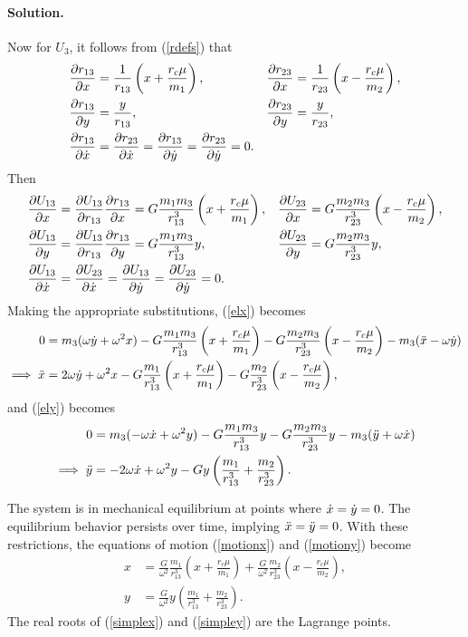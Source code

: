 \documentclass[11pt]{article}
\newcommand{\refeq}[1]{(\ref{#1})}
\newenvironment{solution}
{
    \paragraph{Solution.}
    \ignorespaces
}
{
    \bigskip
}
\begin{document}
\begin{solution}
	Now for $U_3$, it follows from \refeq{rdefs} that
	\begin{align}
		\pdv{r_{13}}{x} &= \frac{1}{r_{13}} \left( x + \frac{r_c \mu}{m_1} \right), &
		\pdv{r_{23}}{x} &= \frac{1}{r_{23}} \left( x - \frac{r_c \mu}{m_2} \right), \\
		\pdv{r_{13}}{y} &= \frac{y}{r_{13}},
		& \pdv{r_{23}}{y} &= \frac{y}{r_{23}}, \\
		\pdv{r_{13}}{\dot{x}} &= \pdv{r_{23}}{\dot{x}} = \pdv{r_{13}}{\dot{y}} = \pdv{r_{23}}{\dot{y}} = 0.
	\end{align}
	Then
	\begin{align}
		\pdv{U_{13}}{x} &= \pdv{U_{13}}{r_{13}} \pdv{r_{13}}{x} = G \frac{m_1 m_3}{r_{13}^3} \left( x + \frac{r_c \mu}{m_1} \right), & 
		\pdv{U_{23}}{x} &= G \frac{m_2 m_3}{r_{23}^3} \left( x - \frac{r_c \mu}{m_2} \right), \\
		\pdv{U_{13}}{y} &= \pdv{U_{13}}{r_{13}} \pdv{r_{13}}{y} = G \frac{m_1 m_3}{r_{13}^3} y, &
		\pdv{U_{23}}{y} &= G \frac{m_2 m_3}{r_{23}^3} y, \\
		\pdv{U_{13}}{\dot{x}} &= \pdv{U_{23}}{\dot{x}} = \pdv{U_{13}}{\dot{y}} = \pdv{U_{23}}{\dot{y}} = 0.
	\end{align}
	Making the appropriate substitutions, \refeq{elx} becomes
	\begin{align}
		0 &= m_3 (\omega \dot{y} + \omega^2 x) - G \frac{m_1 m_3}{r_{13}^3} \left( x + \frac{r_c \mu}{m_1} \right) - G \frac{m_2 m_3}{r_{23}^3} \left( x - \frac{r_c \mu}{m_2} \right) - m_3 (\ddot{x} - \omega \dot{y}) \\
		\implies \ddot{x} &= 2 \omega \dot{y} + \omega^2 x - G \frac{m_1}{r_{13}^3} \left( x + \frac{r_c \mu}{m_1} \right) - G \frac{m_2}{r_{23}^3} \left( x - \frac{r_c \mu}{m_2} \right), \label{motionx}
	\end{align}
	and \refeq{ely} becomes
	\begin{align}
		0 &= m_3 (-\omega \dot{x} + \omega^2 y) - G \frac{m_1 m_3}{r_{13}^3} y - G \frac{m_2 m_3}{r_{23}^3} y - m_3 (\ddot{y} + \omega \dot{x}) \\
		\implies \ddot{y} &= -2 \omega \dot{x} + \omega^2 y - G y \left( \frac{m_1}{r_{13}^3} + \frac{m_2}{r_{23}^3} \right). \label{motiony}
	\end{align}

	The system is in mechanical equilibrium at points where $\dot{x} = \dot{y} = 0$.  The equilibrium behavior persists over time, implying $\ddot{x} = \ddot{y} = 0$.  With these restrictions, the equations of motion \refeq{motionx} and \refeq{motiony} become
	\begin{align}
		x &= \frac{G}{\omega^2} \frac{m_1}{r_{13}^3} \left( x + \frac{r_c \mu}{m_1} \right) + \frac{G}{\omega^2} \frac{m_2}{r_{23}^3} \left( x - \frac{r_c \mu}{m_2} \right), \label{simplex} \\
		y &= \frac{G}{\omega^2} y \left( \frac{m_1}{r_{13}^3} + \frac{m_2}{r_{23}^3} \right).\label{simpley}
	\end{align}
	The real roots of \refeq{simplex} and \refeq{simpley} are the Lagrange points.
	

\end{solution}
\end{document}
